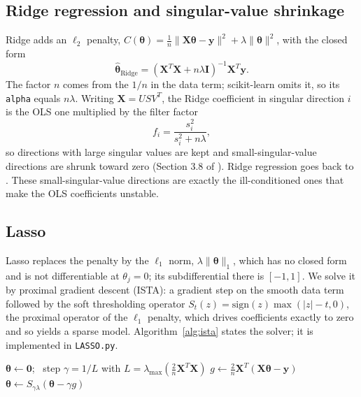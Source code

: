 \documentclass[a4paper,11pt]{article}
\newcommand{\by}{\boldsymbol{y}}
\newcommand{\bX}{\boldsymbol{X}}
\newcommand{\bth}{\boldsymbol{\theta}}
\begin{document}
\subsection{Ridge regression and singular-value shrinkage}
Ridge adds an $\ell_2$ penalty, $C(\bth)=\frac1n\lVert\bX\bth-\by\rVert^2
+\lambda\lVert\bth\rVert^2$, with the closed form
\begin{equation}
\hat{\bth}_{\text{Ridge}}=(\bX^T\bX+n\lambda\boldsymbol{I})^{-1}\bX^T\by .
\end{equation}
The factor $n$ comes from the $1/n$ in the data term; scikit-learn omits it, so
its \texttt{alpha} equals $n\lambda$. Writing $\bX=U S V^T$, the Ridge
coefficient in singular direction $i$ is the OLS one multiplied by the filter
factor
\begin{equation}
f_i=\frac{s_i^2}{s_i^2+n\lambda},
\label{eq:filter}
\end{equation}
so directions with large singular values are kept and small-singular-value
directions are shrunk toward zero (Section 3.8 of \cite{hjorthjensen2026}).
Ridge regression goes back to \cite{hoerl1970}. These
small-singular-value directions are exactly the
ill-conditioned ones that make the OLS coefficients unstable.

\subsection{Lasso}
Lasso \cite{tibshirani1996} replaces the penalty by the $\ell_1$ norm,
$\lambda\lVert\bth\rVert_1$, which has no closed form and is not differentiable
at $\theta_j=0$; its
subdifferential there is $[-1,1]$. We solve it by proximal gradient descent
(ISTA): a gradient step on the smooth data term followed by the soft
thresholding operator $S_t(z)=\mathrm{sign}(z)\max(|z|-t,0)$, the proximal
operator of the $\ell_1$ penalty, which drives coefficients exactly to zero and
so yields a sparse model. Algorithm~\ref{alg:ista} states the solver; it is
implemented in \texttt{LASSO.py}.

\begin{algorithm}[h]
\caption{Proximal gradient descent (ISTA) for Lasso}
\label{alg:ista}
\begin{algorithmic}[1]
\State $\bth \gets \boldsymbol{0}$; \ step $\gamma = 1/L$ with $L=\lambda_{\max}(\tfrac{2}{n}\bX^T\bX)$
\Repeat
  \State $g \gets \tfrac{2}{n}\bX^T(\bX\bth-\by)$ 
  \State $\bth \gets S_{\gamma\lambda}(\bth-\gamma g)$ 
\Until{$\lVert\Delta\bth\rVert < \text{tol}$}
\end{algorithmic}
\end{algorithm}
\end{document}
